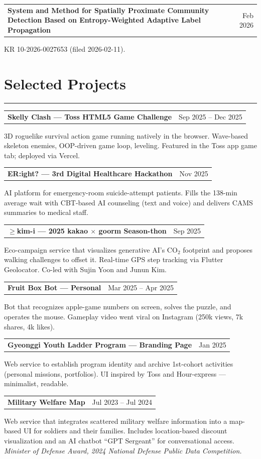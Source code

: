 \documentclass[11pt,letterpaper]{article}
\makeatletter
\newcommand{\cvrow}[2]{%
  \noindent\begin{tabularx}{\linewidth}{@{}X r@{}}\textbf{#1} & {#2}\end{tabularx}\par
}
\newcommand{\cvsub}[1]{\noindent #1\par}
\makeatother
\begin{document}
\cvrow{System and Method for Spatially Proximate Community Detection Based on Entropy-Weighted Adaptive Label Propagation}{Feb 2026}
\cvsub{KR 10-2026-0027653 (filed 2026-02-11).}

\vspace{4pt}
\section*{Selected Projects}
\vspace{-4pt}
\rule{\textwidth}{0.5pt}\vspace{2pt}

\cvrow{Skelly Clash --- Toss HTML5 Game Challenge}{Sep 2025 -- Dec 2025}
\cvsub{3D roguelike survival action game running natively in the browser. Wave-based skeleton enemies, OOP-driven game loop, leveling. Featured in the Toss app game tab; deployed via Vercel.}
\vspace{4pt}

\cvrow{ER:ight? --- 3rd Digital Healthcare Hackathon}{Nov 2025}
\cvsub{AI platform for emergency-room suicide-attempt patients. Fills the 138-min average wait with CBT-based AI counseling (text and voice) and delivers CAMS summaries to medical staff.}
\vspace{4pt}

\cvrow{$\geq$kim-i --- 2025 kakao $\times$ goorm Season-thon}{Sep 2025}
\cvsub{Eco-campaign service that visualizes generative AI's CO$_2$ footprint and proposes walking challenges to offset it. Real-time GPS step tracking via Flutter Geolocator. Co-led with Sujin Yoon and Junun Kim.}
\vspace{4pt}

\cvrow{Fruit Box Bot --- Personal}{Mar 2025 -- Apr 2025}
\cvsub{Bot that recognizes apple-game numbers on screen, solves the puzzle, and operates the mouse. Gameplay video went viral on Instagram (250k views, 7k shares, 4k likes).}
\vspace{4pt}

\cvrow{Gyeonggi Youth Ladder Program --- Branding Page}{Jan 2025}
\cvsub{Web service to establish program identity and archive 1st-cohort activities (personal missions, portfolios). UI inspired by Toss and Hour-express --- minimalist, readable.}
\vspace{4pt}

\cvrow{Military Welfare Map}{Jul 2023 -- Jul 2024}
\cvsub{Web service that integrates scattered military welfare information into a map-based UI for soldiers and their families. Includes location-based discount visualization and an AI chatbot ``GPT Sergeant'' for conversational access. \emph{Minister of Defense Award, 2024 National Defense Public Data Competition.}}
\vspace{4pt}
\end{document}
